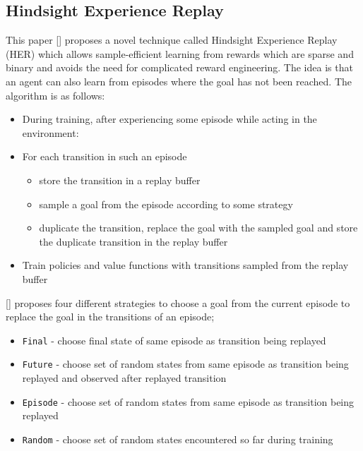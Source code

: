 \documentclass[conference]{IEEEtran}
\begin{document}
\subsection{Hindsight Experience Replay} \label{subsec:her}
This paper [\cite{andrychowicz2017hindsight}] proposes a novel technique called Hindsight Experience Replay (HER) which allows sample-efficient learning from rewards which are sparse and binary and avoids the need for complicated reward engineering. The idea is that an agent can also learn from episodes where the goal has not been reached. The algorithm is as follows:
\begin{itemize}
\item During training, after experiencing some episode while acting in the environment:
\item For each transition in such an episode
\begin{itemize}
    \item store the transition in a replay buffer
    \item sample a goal from the episode according to some strategy
    \item duplicate the transition, replace the goal with the sampled goal and store the duplicate transition in the replay buffer
\end{itemize}
\item Train policies and value functions with transitions sampled from the replay buffer 
\end{itemize}
[\cite{andrychowicz2017hindsight}] proposes four different strategies to choose a goal from the current episode to replace the goal in the transitions of an episode;
\begin{itemize}
 \item \texttt{Final} - choose final state of same episode as transition being replayed
 \item \texttt{Future} - choose set of random states from same episode as transition being replayed and observed after replayed transition
 \item \texttt{Episode} - choose set of random states from same episode as transition being replayed 
 \item \texttt{Random} - choose set of random states encountered so far during training
\end{itemize}
\end{document}
